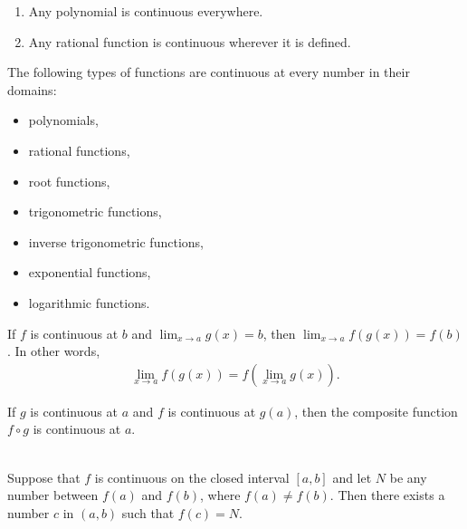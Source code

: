 \documentclass{article}
\begin{document}
\begin{theorem}
    \begin{enumerate}
        \item Any polynomial is continuous everywhere.
        \item Any rational function is continuous wherever it is defined.
    \end{enumerate}
\end{theorem}
\begin{theorem}
    The following types of functions are continuous at every number in their domains:
    \begin{itemize}
        \item polynomials,
        \item rational functions,
        \item root functions,
        \item trigonometric functions,
        \item inverse trigonometric functions,
        \item exponential functions,
        \item logarithmic functions.
    \end{itemize}
\end{theorem}
\begin{theorem}
    If $f$ is continuous at $b$ and $\lim_{x\to a}g(x) = b$, then $\lim_{x\to a}f(g(x))=f(b)$. In other words,
    \begin{align*}
        \lim_{x\to a}f(g(x))=f\left(\lim_{x\to a}g(x)\right).
    \end{align*}
\end{theorem}
\begin{theorem}
    If $g$ is continuous at $a$ and $f$ is continuous at $g(a)$, then the composite function $f\circ g$ is continuous at $a$.
\end{theorem}
\begin{theorem}
    \\
    Suppose that $f$ is continuous on the closed interval $[a,b]$ and let $N$ be any number between $f(a)$ and $f(b)$, where $f(a)\not=f(b)$. Then there exists a number $c$ in $(a,b)$ such that $f(c)=N$.
\end{theorem}
\end{document}
